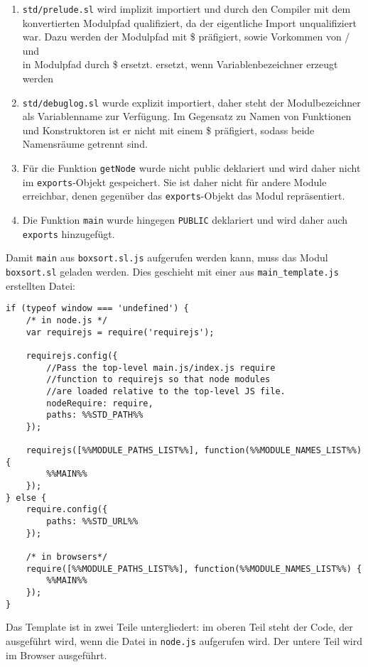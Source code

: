 \documentclass[runningheads]{llncs}
\begin{document}
\begin{enumerate}
\item \texttt{std/prelude.sl} wird implizit importiert und durch den
    Compiler mit dem konvertierten Modulpfad qualifiziert, da der
    eigentliche Import unqualifiziert war. Dazu werden der Modulpfad
    mit \$ präfigiert, sowie Vorkommen von / und \\ in Modulpfad
    durch \$ ersetzt.
ersetzt, wenn Variablenbezeichner erzeugt werden
\item \texttt{std/debuglog.sl} wurde explizit importiert, daher steht
    der Modulbezeichner als Variablenname zur Verfügung. Im Gegensatz
    zu Namen von Funktionen und Konstruktoren ist er nicht mit einem
    \$ präfigiert, sodass beide Namensräume getrennt sind.
\item Für die Funktion \texttt{getNode} wurde nicht public deklariert
    und wird daher nicht im \texttt{exports}-Objekt gespeichert. Sie
    ist daher nicht für andere Module erreichbar, denen gegenüber das
    \texttt{exports}-Objekt das Modul repräsentiert.
\item Die Funktion \texttt{main} wurde hingegen \texttt{PUBLIC}
    deklariert und wird daher auch \texttt{exports} hinzugefügt.
\end{enumerate}

Damit \texttt{main} aus \texttt{boxsort.sl.js} aufgerufen werden kann,
muss das Modul \texttt{boxsort.sl} geladen werden. Dies geschieht mit
einer aus \texttt{main\_template.js} erstellten Datei:

\begin{verbatim}
if (typeof window === 'undefined') {
    /* in node.js */
    var requirejs = require('requirejs');
    
    requirejs.config({
        //Pass the top-level main.js/index.js require
        //function to requirejs so that node modules
        //are loaded relative to the top-level JS file.
        nodeRequire: require,
        paths: %%STD_PATH%%
    });
    
    requirejs([%%MODULE_PATHS_LIST%%], function(%%MODULE_NAMES_LIST%%) {
        %%MAIN%%
    });
} else {
    require.config({
        paths: %%STD_URL%%
    });

    /* in browsers*/ 
    require([%%MODULE_PATHS_LIST%%], function(%%MODULE_NAMES_LIST%%) {
        %%MAIN%%
    });
}
\end{verbatim}

Das Template ist in zwei Teile untergliedert: im oberen Teil steht
der Code, der ausgeführt wird, wenn die Datei in \texttt{node.js}
aufgerufen wird. Der untere Teil wird im Browser ausgeführt.
\end{document}
